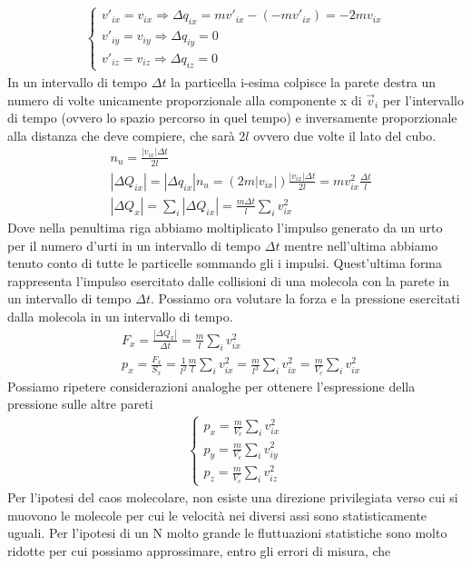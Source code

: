 \documentclass[10pt,a4paper]{article}
\begin{document}
\begin{align*} 
	\begin{cases}
		v'_{ix}=v_{ix} \Rightarrow \Delta q_{ix} = mv'_{ix}-(-mv'_{ix})=-2mv_{ix}\\
		v'_{iy}=v_{iy} \Rightarrow \Delta q_{iy} = 0\\
		v'_{iz}=v_{iz} \Rightarrow \Delta q_{iz} = 0
	\end{cases}
\end{align*} 
In un intervallo di tempo $\Delta t$ la particella i-esima colpisce la parete destra un numero di volte unicamente proporzionale alla componente x di $\vec{v}_i$ per l'intervallo di tempo (ovvero lo spazio percorso in quel tempo) e inversamente proporzionale alla distanza che deve compiere, che sarà $2l$ ovvero due volte il lato del cubo. 
\begin{align*} 
	&n_u = \frac{|v_{ix}| \Delta t}{2l}\\
	&|\Delta Q_{ix}|= |\Delta q_{ix}| n_u = (2m|v_{ix}|) \frac{|v_{ix}| \Delta t}{2l} = m v_{ix}^2 \frac{\Delta t}{l}\\
	&|\Delta Q_{x}| = \sum_i |\Delta Q_{ix}|= \frac{m \Delta t}{l} \sum_i v_{ix}^2 
\end{align*} 
Dove nella penultima riga abbiamo moltiplicato l'impulso generato da un urto per il numero d'urti in un intervallo di tempo $\Delta t$ mentre nell'ultima abbiamo tenuto conto di tutte le particelle sommando gli i impulsi. Quest'ultima forma rappresenta l'impulso esercitato dalle collisioni di una molecola con la parete in un intervallo di tempo $\Delta t$.
Possiamo ora volutare la forza e la pressione esercitati dalla molecola in un intervallo di tempo. 
\begin{align*} 
	&F_x = \frac{|\Delta Q_{x}|}{\Delta t} =  \frac{m}{l} \sum_i v_{ix}^2\\
	&p_x = \frac{F_{x}}{S_x} =  \frac{1}{l^2}\frac{m}{l} \sum_i v_{ix}^2=\frac{m}{l^3} \sum_i v_{ix}^2 = \frac{m}{V_c} \sum_i v_{ix}^2
\end{align*} 
Possiamo ripetere considerazioni analoghe per ottenere l'espressione della pressione sulle altre pareti
\begin{align*} 
	\begin{cases}
		p_x = \frac{m}{V_c} \sum_i v_{ix}^2\\
		p_y = \frac{m}{V_c} \sum_i v_{iy}^2\\
		p_z = \frac{m}{V_c} \sum_i v_{iz}^2
	\end{cases}
\end{align*} 
Per l'ipotesi del caos molecolare, non esiste una direzione privilegiata verso cui si muovono le molecole per cui le velocità nei diversi assi sono statisticamente uguali. Per l'ipotesi di un N molto grande le fluttuazioni statistiche sono molto ridotte per cui possiamo approssimare, entro gli errori di misura, che 
\end{document}
